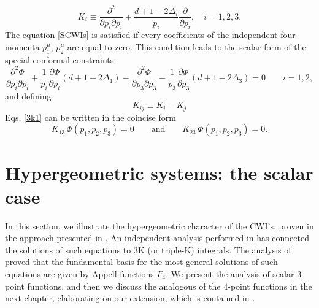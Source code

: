 \documentclass[a4paper,11pt,openright,twoside]{book}
\numberwithin{equation}{section}
\begin{document}
\begin{equation}
	\label{Koper1}
	{ K}_i\equiv \frac{\partial^2}{\partial    p_i \partial    p_i} 
	+\frac{d + 1 - 2 \Delta_i}{   p_i}\frac{\partial}{\partial   p_i}, \quad i=1,2,3. 
\end{equation}
The equation \eqref{SCWIs} is satisfied if every coefficients of the independent four-momenta $p_1^\mu,\,p_2^\mu$ are equal to zero. This condition leads to the scalar form of the special conformal constraints 
\begin{equation}
	\frac{\partial^2\Phi}{\partial   p_i\partial   p_i}+
	\frac{1}{  p_i}\frac{\partial\Phi}{\partial  p_i}(d+1-2 \Delta_1)-
	\frac{\partial^2\Phi}{\partial   p_3\partial   p_3} -
	\frac{1}{  p_3}\frac{\partial\Phi}{\partial  p_3}(d +1 -2 \Delta_3)=0\qquad i=1,2,
	\label{3k1}
\end{equation}
and defining 
\begin{equation}
	\label{kij}
	K_{ij}\equiv {K}_i-{K}_j
\end{equation}
Eqs. \eqref{3k1} can be written in the coincise form 
\begin{equation}
	\label{3k2}
	K_{13}\,\Phi(p_1,p_2,p_3)=0 \qquad \textrm{and} \qquad K_{23}\,\Phi(p_1,p_2,p_3)=0.
\end{equation}

\section{Hypergeometric systems: the scalar case}\label{Sol3Point}

In this section, we illustrate the hypergeometric character of the CWI's, proven in the approach presented in \cite{Coriano:2013jba, Coriano:2018bsy, Coriano:2018bbe, Maglio:2019grh}. An independent analysis performed in \cite{Bzowski:2013sza} has connected the solutions of such equations to 3K (or triple-K) integrals. The analysis of \cite{Coriano:2013jba} proved that the fundamental basis for the most general solutions of such equations are given by Appell functions $F_4$.
We present the analysis of scalar $3$-point functions, and then we discuss the analogous of the $4$-point functions in the next chapter, elaborating on our extension, which is contained in \cite{Maglio:2019grh,Coriano:2020ccb}.
\end{document}
